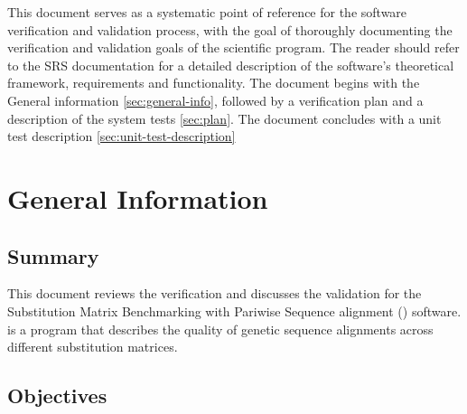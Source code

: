 \documentclass[12pt, titlepage]{article}
\begin{document}


\bigskip

This document serves as a systematic point of reference for the \progname{} software verification and validation process,
with the goal of thoroughly documenting the verification and validation goals of the scientific program.
The reader should refer to the SRS documentation for a detailed description of the software's theoretical framework, requirements
 and functionality. The document begins with the General information \autoref{sec:general-info}, followed by a verification plan and 
 a description of the system tests \autoref{sec:plan}. The document concludes with a unit test description \autoref{sec:unit-test-description}

\section{General Information}\label{sec:general-info}

\subsection{Summary}

This document reviews the verification and discusses the validation for the Substitution Matrix 
Benchmarking with Pariwise Sequence alignment (\progname{}) software. \progname{} is a program 
that describes the quality of genetic sequence alignments across different substitution matrices.


\subsection{Objectives}
\end{document}
